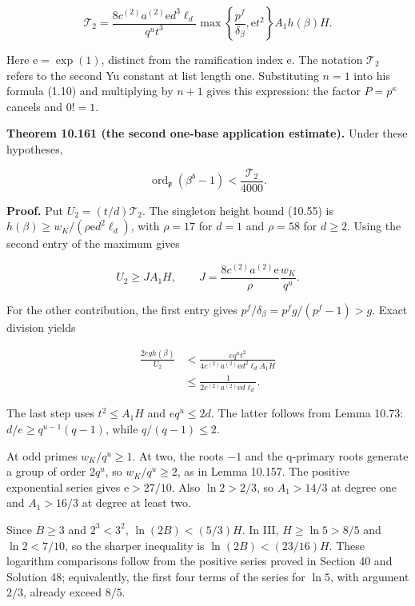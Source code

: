 \documentclass[
  11pt,
  a4paper,
]{article}
\begin{document}
\[
\mathcal T_2=
\frac{8c^{(2)}a^{(2)}\mathrm e d^3\ell_d}{q^ut^3}
\max\left\{\frac{p^f}{\delta_\beta},\mathrm e t^2\right\}
A_1h(\beta)H.
\tag{10.519}
\]

Here \(\mathrm e=\exp(1)\), distinct from the ramification index e. The
notation \(\mathcal T_2\) refers to the second Yu constant at list
length one. Substituting \(n=1\) into his formula (1.10) and multiplying
by \(n+1\) gives this expression: the factor \(P=p^\kappa\) cancels and
\(0!=1\).

\textbf{Theorem 10.161 (the second one-base application estimate).}
Under these hypotheses,

\[
\operatorname{ord}_{\mathfrak p}(\beta^b-1)
<\frac{\mathcal T_2}{4000}.
\tag{10.520}
\]

\textbf{Proof.} Put \(U_2=(t/d)\mathcal T_2\). The singleton height
bound (10.55) is \(h(\beta)\ge w_K/(\rho\mathrm e d^2\ell_d)\), with
\(\rho=17\) for \(d=1\) and \(\rho=58\) for \(d\ge2\). Using the second
entry of the maximum gives

\[
U_2\ge JA_1H,\qquad
J=\frac{8c^{(2)}a^{(2)}\mathrm e}{\rho}
\frac{w_K}{q^u}.
\tag{10.521}
\]

For the other contribution, the first entry gives
\(p^f/\delta_\beta=p^fg/(p^f-1)>g\). Exact division yields

\[
\begin{aligned}
\frac{2eg h(\beta)}{U_2}
&<\frac{eq^ut^2}
{4c^{(2)}a^{(2)}\mathrm e d^2\ell_dA_1H}\\
&\le\frac1{2c^{(2)}a^{(2)}\mathrm e d\ell_d}.
\end{aligned}
\tag{10.522}
\]

The last step uses \(t^2\le A_1H\) and \(eq^u\le2d\). The latter follows
from Lemma 10.73: \(d/e\ge q^{u-1}(q-1)\), while \(q/(q-1)\le2\).

At odd primes \(w_K/q^u\ge1\). At two, the roots \(-1\) and the
q-primary roots generate a group of order \(2q^u\), so \(w_K/q^u\ge2\),
as in Lemma 10.157. The positive exponential series gives
\(\mathrm e>27/10\). Also \(\ln2>2/3\), so \(A_1>14/3\) at degree one
and \(A_1>16/3\) at degree at least two.

Since \(B\ge3\) and \(2^3<3^2\), \(\ln(2B)<(5/3)H\). In III,
\(H\ge\ln5>8/5\) and \(\ln2<7/10\), so the sharper inequality is
\(\ln(2B)<(23/16)H\). These logarithm comparisons follow from the
positive series proved in Section 40 and Solution 48; equivalently, the
first four terms of the series for \(\ln5\), with argument \(2/3\),
already exceed \(8/5\).
\end{document}
